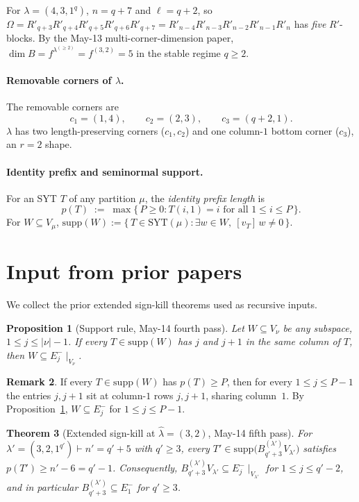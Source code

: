 \documentclass[11pt]{article}
\newtheorem{theorem}{Theorem}
\newtheorem{proposition}[theorem]{Proposition}
\theoremstyle{definition}
\newtheorem{remark}[theorem]{Remark}
\newcommand{\Om}{\Omega}
\newcommand{\hatl}{\widehat\lambda}
\newcommand{\supp}{\mathrm{supp}}
\newcommand{\SYT}{\mathrm{SYT}}
\newcommand{\Rp}{{R'}}
\begin{document}
For $\lambda = (4, 3, 1^q)$, $n = q + 7$ and $\ell = q + 2$, so
$\Om = \Rp_{q+3}\Rp_{q+4}\Rp_{q+5}\Rp_{q+6}\Rp_{q+7} =
\Rp_{n-4}\Rp_{n-3}\Rp_{n-2}\Rp_{n-1}\Rp_n$
has \emph{five} $\Rp$-blocks.  By the May-13 multi-corner-dimension
paper, $\dim B = f^{\lambda^{(\ge 2)}} = f^{(3, 2)} = 5$ in the stable
regime $q \ge 2$.

\paragraph{Removable corners of $\lambda$.}
The removable corners are
\[
   c_1 = (1, 4), \qquad c_2 = (2, 3), \qquad c_3 = (q+2, 1).
\]
$\lambda$ has two length-preserving corners ($c_1, c_2$) and one
column-$1$ bottom corner ($c_3$), an $r = 2$ shape.

\paragraph{Identity prefix and seminormal support.}  For an SYT $T$
of any partition $\mu$, the \emph{identity prefix length} is
\[
   p(T) \;:=\; \max\{\,P \ge 0 : T(i, 1) = i \text{ for all }
   1 \le i \le P\,\}.
\]
For $W \subseteq V_\mu$,
$\supp(W) := \{\,T \in \SYT(\mu) : \exists w \in W,\ [v_T]\,w \ne 0\,\}$.

\section{Input from prior papers}\label{sec:input}

We collect the prior extended sign-kill theorems used as recursive
inputs.

\begin{proposition}[Support rule, May-14 fourth pass]\label{prop:support-rule}
Let $W \subseteq V_\nu$ be any subspace, $1 \le j \le |\nu|-1$.
If every $T \in \supp(W)$ has $j$ and $j+1$ in the same column of $T$,
then $W \subseteq E_j^-\!\mid_{V_\nu}$.
\end{proposition}

\begin{remark}\label{rem:prefix-implies-Ej-}
If every $T \in \supp(W)$ has $p(T) \ge P$, then for every
$1 \le j \le P - 1$ the entries $j, j+1$ sit at column-$1$ rows
$j, j+1$, sharing column~$1$.  By Proposition~\ref{prop:support-rule},
$W \subseteq E_j^-$ for $1 \le j \le P - 1$.
\end{remark}

\begin{theorem}[Extended sign-kill at $\hatl = (3, 2)$, May-14 fifth pass]\label{thm:32-prefix}
For $\lambda' = (3, 2, 1^{q'}) \vdash n' = q' + 5$ with $q' \ge 3$,
every $T' \in \supp\bigl(B^{(\lambda')}_{q'+3} V_{\lambda'}\bigr)$
satisfies $p(T') \ge n' - 6 = q' - 1$.  Consequently,
$B^{(\lambda')}_{q'+3} V_{\lambda'} \subseteq E_j^-\!\mid_{V_{\lambda'}}$
for $1 \le j \le q' - 2$, and in particular $B^{(\lambda')}_{q'+3} \subseteq E_1^-$
for $q' \ge 3$.
\end{theorem}
\end{document}
